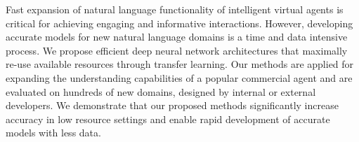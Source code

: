 Fast expansion of natural language functionality of intelligent virtual agents is critical for achieving engaging and informative interactions. However, developing accurate models for new natural language domains is a time and data intensive process. We propose efficient deep neural network architectures that maximally re-use available resources through transfer learning. Our methods are applied for expanding the understanding capabilities of a popular commercial agent and are evaluated on hundreds of new domains, designed by internal or external developers. We demonstrate that our proposed methods significantly increase accuracy in low resource settings and enable rapid development of accurate models with less data.
